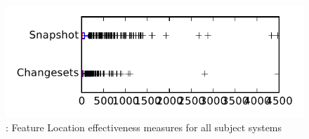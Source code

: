 
\begin{figure}
\centering
\includegraphics[height=0.4\textheight]{figures/flt/rq1_tiny}
\caption{\fone: Feature Location effectiveness measures for all subject systems}
\label{fig:flt:rq1:tiny}
\end{figure}
